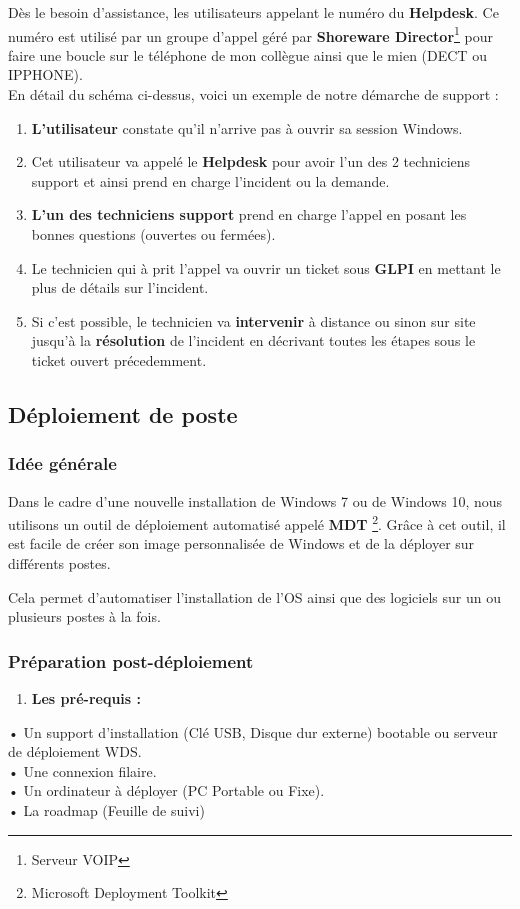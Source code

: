 \documentclass[11pt,a4paper,oneside]{article}
\begin{document}
Dès le besoin d'assistance, les utilisateurs appelant le numéro du \textbf{Helpdesk}. Ce numéro est utilisé par un groupe d'appel géré par \textbf{Shoreware Director}\footnote{Serveur VOIP} pour faire une boucle sur le téléphone de mon collègue ainsi que le mien (DECT ou IPPHONE). \\

En détail du schéma ci-dessus, voici un exemple de notre démarche de support :

\begin{enumerate}
\item \textbf{L'utilisateur} constate qu'il n'arrive pas à ouvrir sa session Windows.
\item Cet utilisateur va appelé le \textbf{Helpdesk} pour avoir l'un des 2 techniciens support et ainsi prend en charge l'incident ou la demande.
\item \textbf{L'un des techniciens support} prend en charge l'appel en posant les bonnes questions (ouvertes ou fermées).
\item Le technicien qui à prit l'appel va ouvrir un ticket sous \textbf{GLPI} en mettant le plus de détails sur l'incident.
\item  Si c'est possible, le technicien va \textbf{intervenir} à distance ou sinon sur site jusqu'à la \textbf{résolution} de l'incident en décrivant toutes les étapes sous le ticket ouvert précedemment.
\end{enumerate}

\newpage

\subsection{Déploiement de poste}
\subsubsection{Idée générale}

Dans le cadre d’une nouvelle installation de Windows 7 ou de Windows 10, nous utilisons un outil de déploiement automatisé appelé \textbf{MDT} \footnote{Microsoft Deployment Toolkit}.
Grâce à cet outil, il est facile de créer son image personnalisée de Windows et de la déployer sur différents postes.

Cela permet d’automatiser l’installation de l’OS ainsi que des logiciels sur un ou plusieurs postes à la fois.
\subsubsection{Préparation post-déploiement}
\begin{enumerate}
    \item \textbf{Les pré-requis :}
\end{enumerate}
•	Un support d’installation (Clé USB, Disque dur externe) bootable ou serveur de déploiement WDS. \\
•	Une connexion filaire. \\
•	Un ordinateur à déployer (PC Portable ou Fixe). \\
•	La roadmap (Feuille de suivi)
\end{document}
